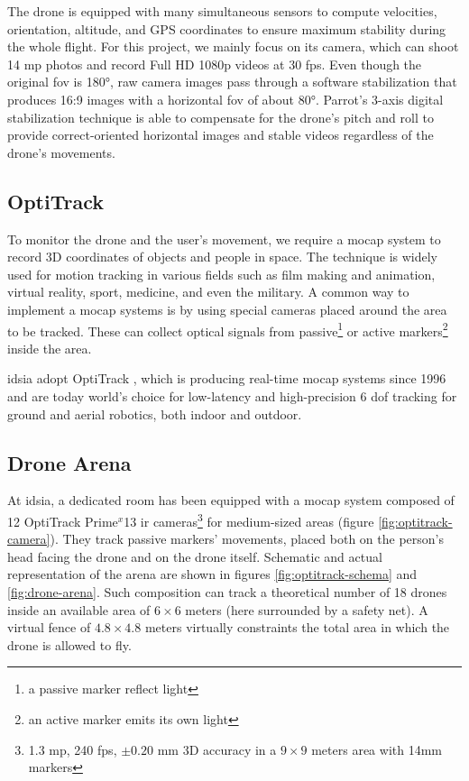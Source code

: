 The drone is equipped with many simultaneous sensors to compute velocities, orientation, altitude, and GPS coordinates to ensure maximum stability during the whole flight. For this project, we mainly focus on its camera, which can shoot 14 \gls{mp} photos and record Full HD 1080p videos at 30 \gls{fps}. Even though the original \gls{fov} is 180°, raw camera images pass through a software stabilization that produces 16:9 images with a horizontal \gls{fov} of about 80°. Parrot's 3-axis digital stabilization technique is able to compensate for the drone's pitch and roll to provide correct-oriented horizontal images and stable videos regardless of the drone's movements.



\subsection{OptiTrack}
\label{subsec:optitrack}

To monitor the drone and the user's movement, we require a \gls{mocap} system to record 3D coordinates of objects and people in space. The technique is widely used for motion tracking in various fields such as film making and animation, virtual reality, sport, medicine, and even the military. A common way to implement a \gls{mocap} systems is by using special cameras placed around the area to be tracked. These can collect optical signals from passive\footnote{a passive marker reflect light} or active markers\footnote{an active marker emits its own light} inside the area.

\medskip

\gls{idsia} adopt OptiTrack \cite{optitrack}, which is producing real-time \gls{mocap} systems since 1996 and are today world’s choice for low-latency and high-precision 6 \gls{dof} tracking for ground and aerial robotics, both indoor and outdoor.



\subsection{Drone Arena}
\label{subsec:drone-arena}

At \gls{idsia}, a dedicated room has been equipped with a \gls{mocap} system composed of 12 OptiTrack Prime$^x$13 \gls{ir} cameras\footnote{1.3 \gls{mp}, 240 \gls{fps}, $\pm0.20$ mm 3D accuracy in a $9 \times 9$ meters area with 14mm markers} for medium-sized areas (figure \ref{fig:optitrack-camera}). They track passive markers' movements, placed both on the person's head facing the drone and on the drone itself. Schematic and actual representation of the arena are shown in figures \ref{fig:optitrack-schema} and \ref{fig:drone-arena}. Such composition can track a theoretical number of 18 drones inside an available area of $6 \times 6$ meters (here surrounded by a safety net). A virtual fence of $4.8 \times 4.8$ meters virtually constraints the total area in which the drone is allowed to fly.

